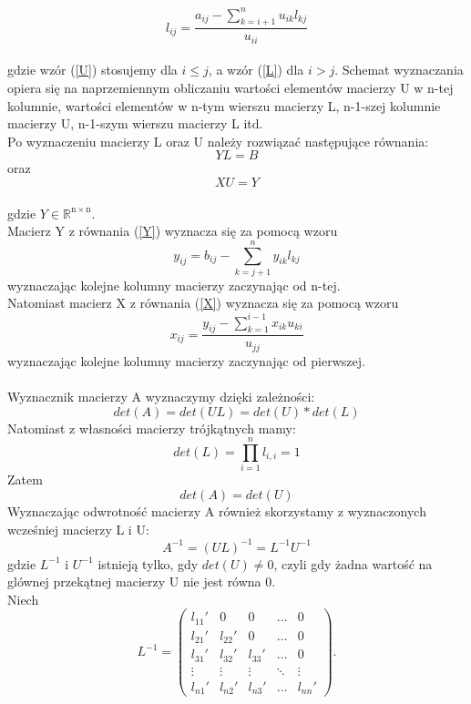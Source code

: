 \documentclass[12pt]{article}
\begin{document}
\begin{equation}
l_{ij}=\dfrac{a_{ij}-\sum_{k=i+1}^n u_{ik}l_{kj}}{u_{ii}} \label{L}
\end{equation}
\\
gdzie wz\'or (\ref{U}) stosujemy dla $i \leq j$, a wz\'or (\ref{L}) dla $i > j$.
Schemat wyznaczania opiera si\k{e} na naprzemiennym obliczaniu warto\'sci element\'ow macierzy U w n-tej kolumnie, warto\'sci element\'ow w n-tym wierszu macierzy L, n-1-szej kolumnie macierzy U, n-1-szym wierszu macierzy L itd.
\\
Po wyznaczeniu macierzy L oraz U nale\.zy rozwi\k{a}za\'c nast\k{e}puj\k{a}ce r\'ownania:
\begin{equation}
YL=B \label{Y}
\end{equation}
oraz
\begin{equation}
XU=Y \label{X}
\end{equation}
\\
gdzie $Y\in \mathbb R^\mathrm{n\times n}$. 
\\
Macierz Y z r\'ownania (\ref{Y}) wyznacza si\k{e} za pomoc\k{a} wzoru
\[
y_{ij}=b_{ij}-\sum_{k=j+1}^n y_{ik}l_{kj} 
\]
wyznaczaj\k{a}c kolejne kolumny macierzy zaczynaj\k{a}c od n-tej. 
\\
 Natomiast macierz X z r\'ownania (\ref{X}) wyznacza si\k{e} za pomoc\k{a} wzoru
 \[
 x_{ij}=\frac{y_{ij}-\sum_{k=1}^{i-1} x_{ik}u_{ki}}{u_{jj}}
 \]
 wyznaczaj\k{a}c kolejne kolumny macierzy zaczynaj\k{a}c od pierwszej. 
\\
\\
Wyznacznik macierzy A wyznaczymy dzi\k{e}ki zale\.zno\'sci:
\[
det(A)=det(UL)=det(U)*det(L)
\]
Natomiast z w\l{}asno\'sci macierzy tr\'ojk\k{a}tnych mamy:
\[
det(L)=\prod_{i=1}^n l_{i,i}=1
\]
Zatem 
\[
det(A)=det(U)
\]
Wyznaczaj\k{a}c odwrotno\'s\'c macierzy A r\'ownie\.z skorzystamy z wyznaczonych wcze\'sniej macierzy L i U:
\[
A^{-1}=(UL)^{-1}=L^{-1}U^{-1}
\]
gdzie $L^{-1}$ i $U^{-1}$ istniej\k{a} tylko, gdy $det(U)\neq 0$, czyli gdy \.zadna warto\'s\'c na gl\'ownej przek\k{a}tnej macierzy U nie jest r\'owna 0.
\\
Niech 
\[
L^{-1}=\begin{pmatrix}
l_{11}' & 0 & 0 & \ldots & 0 \\
l_{21}' & l_{22}' & 0 & \ldots & 0 \\
l_{31}' & l_{32}' & l_{33}' & \ldots & 0 \\
\vdots & \vdots & \vdots & \ddots & \vdots \\
l_{n1}' & l_{n2}' & l_{n3}' & \ldots & l_{nn}'
\end{pmatrix}.
\]
\end{document}
